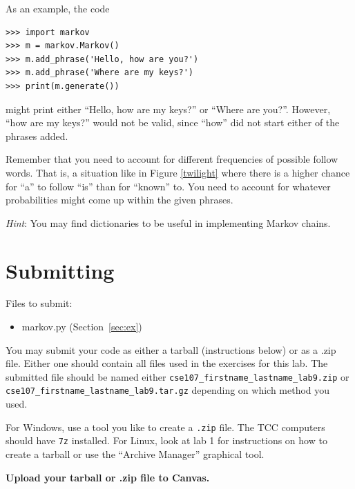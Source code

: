 \documentclass[11pt]{cselabheader}
\begin{document}
\begin{description}
  As an example, the code
\begin{lstlisting}[style=ipython]
>>> import markov
>>> m = markov.Markov()
>>> m.add_phrase('Hello, how are you?')
>>> m.add_phrase('Where are my keys?')
>>> print(m.generate())
\end{lstlisting}
  might print either ``Hello, how are my keys?'' or ``Where are you?''.
  However, ``how are my keys?'' would not be valid, since ``how'' did
  not start either of the phrases added.

  Remember that you need to account for different frequencies of possible
  follow words. That is, a situation like in Figure \ref{twilight} where
  there is a higher chance for ``a'' to follow ``is'' than for ``known''
  to. You need to account for whatever probabilities might come up within
  the given phrases.

  \emph{Hint}: You may find dictionaries to be useful in implementing
  Markov chains.

\end{description}

\pagebreak
\section{Submitting}

Files to submit:
\begin{itemize}
\item markov.py (Section~\ref{sec:ex})
\end{itemize}

You may submit your code as either a tarball (instructions below) or as a .zip
file. Either one should contain all files used in the exercises for this lab.
The submitted file should be named either
\texttt{cse107\_firstname\_lastname\_lab9.zip} or
\texttt{cse107\_firstname\_lastname\_lab9.tar.gz} depending on which method you
used.

For Windows, use a tool you like to create a \texttt{.zip} file. The TCC
computers should have \texttt{7z} installed. For Linux, look at lab 1 for
instructions on how to create a tarball or use the ``Archive Manager'' graphical
tool.

\begin{center}
  \textbf{Upload your tarball or .zip file to Canvas.}
\end{center}
\end{document}

